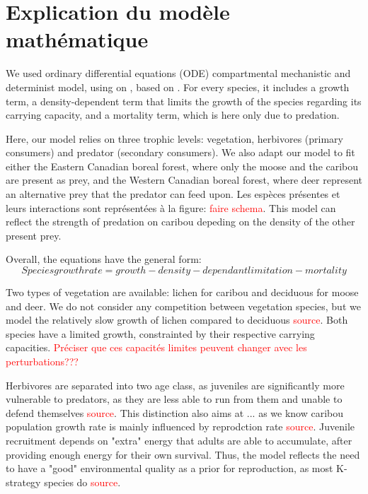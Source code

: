 
\section{Explication du modèle mathématique}

We used ordinary differential equations (ODE) compartmental mechanistic and determinist model, using on , based on \cite{lamirande2022}. For every species, it includes a growth term, a density-dependent term that limits the growth of the species regarding its carrying capacity, and a mortality term, which is here only due to predation.

Here, our model relies on three trophic levels: vegetation, herbivores (primary consumers) and predator (secondary consumers). We also adapt our model to fit either the Eastern Canadian boreal forest, where only the moose and the caribou are present as prey, and the Western Canadian boreal forest, where deer represent an alternative prey that the predator can feed upon.  Les espèces présentes et leurs interactions sont représentées à la figure: \textcolor{red}{faire schema}. This model can reflect the strength of predation on caribou depeding on the density of the other present prey. 


Overall, the equations have the general form: 
\begin{equation}
    Species growth rate = growth - density-dependant limitation - mortality
\end{equation}

Two types of vegetation are available: lichen for caribou and deciduous for moose and deer. We do not consider any competition between vegetation species, but we model the relatively slow growth of lichen compared to deciduous \textcolor{red}{source}. Both species have a limited growth, constrainted by their respective carrying capacities.
\textcolor{red}{Préciser que ces capacités limites peuvent changer avec les perturbations???}

Herbivores are separated into two age class, as juveniles are significantly more vulnerable to predators, as they are less able to run from them and unable to defend themselves \textcolor{red}{source}. This distinction also aims at ... as we know caribou population growth rate is mainly influenced by reprodction rate \textcolor{red}{source}. Juvenile recruitment depends on "extra" energy that adults are able to accumulate, after providing enough energy for their own survival. Thus, the model reflects the need to have a "good" environmental quality as a prior for reproduction, as most K-strategy species do 
\textcolor{red}{source}. 


